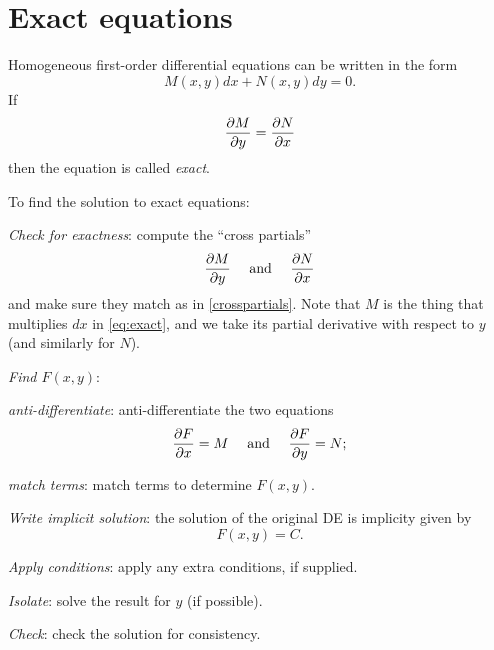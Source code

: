\documentclass{book}
\begin{document}


\newpage
\section{Exact equations}

Homogeneous first-order differential equations can be written in the form
\begin{dmath}
  \label{eq:exact}
  M(x,y) dx + N(x,y) dy = 0.
\end{dmath}
If
\begin{dmath}
  \label{crosspartials}
  \pp{M}{y} = \pp{N}{x}
\end{dmath}
then the equation is called \emph{exact}.

To find the solution to exact equations:
\begin{enumerate*}
\item \emph{Check for exactness}: compute the ``cross partials''
  \begin{equation*}
    \frac{\partial M}{\partial y} \quad \text{ and } \quad \frac{\partial N}{\partial x}
  \end{equation*}
  and make sure they match as in \eqref{crosspartials}.  Note that $M$
  is the thing that multiplies $dx$ in \eqref{eq:exact}, and we take
  its partial derivative with respect to $y$ (and similarly for $N$).
\item \emph{Find $F(x,y)$}:
  \begin{enumerate*}
  \item \emph{anti-differentiate}: anti-differentiate the two equations
    \begin{equation*}
      \frac{\partial F}{\partial x} = M \quad \text{ and } \quad \frac{\partial F}{\partial y} = N;
    \end{equation*}
  \item \emph{match terms}: match terms to determine $F(x,y)$.
  \end{enumerate*}
\item \emph{Write implicit solution}: the solution of the original DE is implicity given by
  \begin{equation*}
    F(x,y) = C.
  \end{equation*}
\item \emph{Apply conditions}: apply any extra conditions, if supplied.
\item \emph{Isolate}: solve the result for $y$ (if possible).
\item \emph{Check}: check the solution for consistency.
\end{enumerate*}
\end{document}
